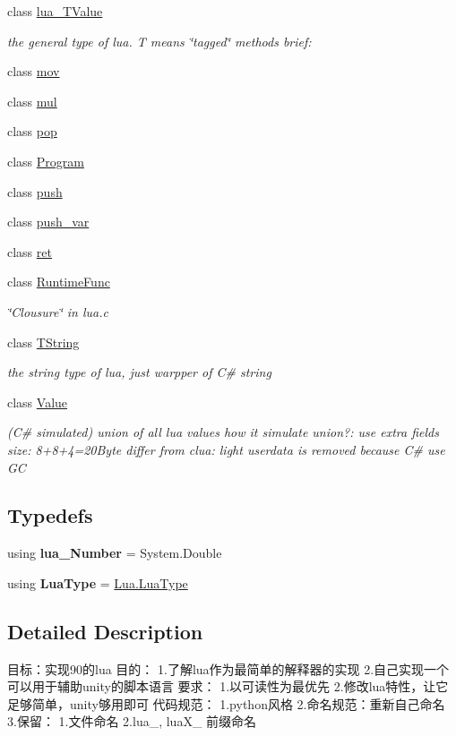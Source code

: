 \begin{DoxyCompactItemize}
\item 
class \mbox{\hyperlink{classzlua_1_1lua___t_value}{lua\+\_\+\+T\+Value}}
\begin{DoxyCompactList}\small\item\em the general type of lua. T means \char`\"{}tagged\char`\"{} methods brief\+: \end{DoxyCompactList}\item 
class \mbox{\hyperlink{classzlua_1_1mov}{mov}}
\item 
class \mbox{\hyperlink{classzlua_1_1mul}{mul}}
\item 
class \mbox{\hyperlink{classzlua_1_1pop}{pop}}
\item 
class \mbox{\hyperlink{classzlua_1_1_program}{Program}}
\item 
class \mbox{\hyperlink{classzlua_1_1push}{push}}
\item 
class \mbox{\hyperlink{classzlua_1_1push__var}{push\+\_\+var}}
\item 
class \mbox{\hyperlink{classzlua_1_1ret}{ret}}
\item 
class \mbox{\hyperlink{classzlua_1_1_runtime_func}{Runtime\+Func}}
\begin{DoxyCompactList}\small\item\em \char`\"{}\+Clousure\char`\"{} in lua.\+c \end{DoxyCompactList}\item 
class \mbox{\hyperlink{classzlua_1_1_t_string}{T\+String}}
\begin{DoxyCompactList}\small\item\em the string type of lua, just warpper of C\# string \end{DoxyCompactList}\item 
class \mbox{\hyperlink{classzlua_1_1_value}{Value}}
\begin{DoxyCompactList}\small\item\em (C\# simulated) union of all lua values how it simulate union?\+: use extra fields size\+: 8+8+4=20\+Byte differ from clua\+: light userdata is removed because C\# use GC \end{DoxyCompactList}\end{DoxyCompactItemize}
\subsection*{Typedefs}
\begin{DoxyCompactItemize}
\item 
\mbox{\label{namespacezlua_a61d392d834c4b17a298224ed0db6a947}} 
using {\bfseries lua\+\_\+\+Number} = System.\+Double
\item 
\mbox{\label{namespacezlua_a2b3709db4de9a217dcac9e793c531c62}} 
using {\bfseries Lua\+Type} = \mbox{\hyperlink{classzlua_1_1_lua_a3bea46ecc2aabf23ac160bd7e7172e70}{Lua.\+Lua\+Type}}
\end{DoxyCompactItemize}


\subsection{Detailed Description}
目标：实现90的lua 目的： 1.了解lua作为最简单的解释器的实现 2.自己实现一个可以用于辅助unity的脚本语言 要求： 1.以可读性为最优先 2.修改lua特性，让它足够简单，unity够用即可 代码规范： 1.\+python风格 2.命名规范：重新自己命名 3.保留： 1.文件命名 2.\+lua\+\_\+, lua\+X\+\_\+ 前缀命名 

